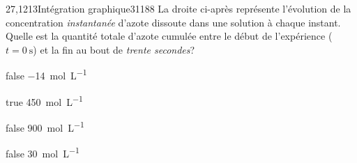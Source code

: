         \begin{question}{27,1213}{Intégration graphique}{3}{1188}
            La droite ci-après représente l'évolution de la concentration \emph{instantanée} d'azote dissoute dans une solution à chaque instant. Quelle est la quantité totale d'azote cumulée entre le début de l'expérience ($t=\SI{0}{\second}$) et la fin au bout de \emph{trente secondes}?
            \begin{figure}
             \end{figure}
        \end{question}
        \begin{reponses}
            \item[false] \SI{-14}{\mol\per\liter}
		    \item[true] \SI{450}{\mol\per\liter}
		    \item[false] \SI{900}{\mol\per\liter}
		    \item[false] \SI{30}{\mol\per\liter}
		    \end{reponses}
